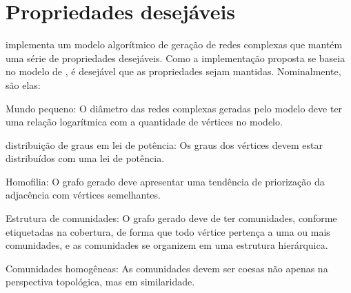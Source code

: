 \documentclass[notes.tex]{subfiles}
\begin{document}
\section{Propriedades desejáveis}

 implementa um modelo algorítmico de geração de redes complexas que mantém uma série de propriedades desejáveis.
Como a implementação proposta se baseia no modelo de , é desejável que as propriedades sejam mantidas.
Nominalmente, são elas:

\begin{alineas}
    \item Mundo pequeno: O diâmetro das redes complexas geradas pelo modelo deve ter uma relação logarítmica com a quantidade de vértices no modelo.
    \item distribuição de graus em lei de potência: Os graus dos vértices devem estar distribuídos com uma lei de potência.
    \item Homofilia: O grafo gerado deve apresentar uma tendência de priorização da adjacência com vértices semelhantes.
    \item Estrutura de comunidades: O grafo gerado deve de ter comunidades, conforme etiquetadas na cobertura, de forma que todo vértice pertença a uma ou mais comunidades, e as comunidades se organizem em uma estrutura hierárquica.
    \item Comunidades homogêneas: As comunidades devem ser coesas não apenas na perspectiva topológica, mas em similaridade.
\end{alineas}
\end{document}
